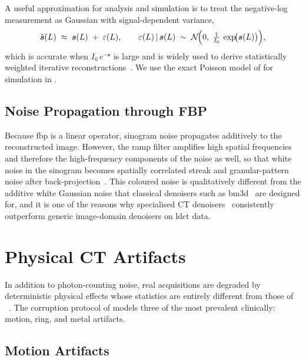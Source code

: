 A useful approximation for analysis and simulation is to treat the negative-log measurement as Gaussian with signal-dependent variance,
\begin{equation}
    \tilde{\boldsymbol{s}}(L) \;\approx\; \boldsymbol{s}(L) \;+\; \varepsilon(L),
    \qquad \varepsilon(L)\,|\,\boldsymbol{s}(L) \;\sim\; \mathcal{N}\!\Bigl(0,\;\tfrac{1}{I_{0}}\,\exp\!\bigl(\boldsymbol{s}(L)\bigr)\Bigr),
    \label{eq:gaussian_approx}
\end{equation}
which is accurate when $I_{0}\,e^{-\boldsymbol{s}}$ is large and is widely used to derive statistically weighted iterative
reconstructions~\cite{Whiting2006, Sadia2024}. We use the exact Poisson model of  for simulation in .

\subsection{Noise Propagation through FBP}
\label{subsec:bg_noise_propagation}

Because \gls{fbp} is a linear operator, sinogram noise propagates additively to the reconstructed image. However, the ramp filter amplifies high spatial frequencies and therefore the high-frequency components of the noise as well, so that white noise in the sinogram becomes spatially correlated streak and granular-pattern noise after
back-projection~\cite{KakSlaney1988, Leuschner2021}. This coloured noise is qualitatively different from the additive white Gaussian noise that classical denoisers such
as \gls{bm3d}~\cite{Dabov2007} are designed for, and it is one of the reasons why specialised CT denoisers~\cite{Chen2017, Komolafe2024} consistently outperform
generic image-domain denoisers on \gls{ldct} data.

\section{Physical CT Artifacts}
\label{sec:bg_artifacts}

In addition to photon-counting noise, real acquisitions are degraded by deterministic physical effects whose statistics are entirely different from those of
~\cite{Boas2012}. The corruption protocol of  models three of the most prevalent clinically: motion, ring, and metal artifacts.

\subsection{Motion Artifacts}
\label{subsec:bg_motion}

